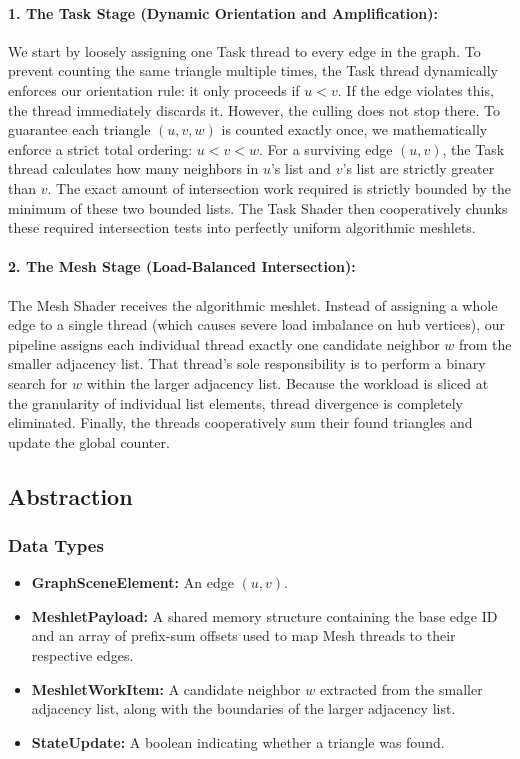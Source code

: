 \documentclass[11pt, a4paper]{article}
\begin{document}
\paragraph{1. The Task Stage (Dynamic Orientation and Amplification):}
We start by loosely assigning one Task thread to every edge in the graph. To prevent counting the same triangle multiple times, the Task thread dynamically enforces our orientation rule: it only proceeds if $u < v$. If the edge violates this, the thread immediately discards it. However, the culling does not stop there. To guarantee each triangle $(u, v, w)$ is counted exactly once, we mathematically enforce a strict total ordering: $u < v < w$. For a surviving edge $(u, v)$, the Task thread calculates how many neighbors in $u$'s list and $v$'s list are strictly greater than $v$. The exact amount of intersection work required is strictly bounded by the minimum of these two bounded lists. The Task Shader then cooperatively chunks these required intersection tests into perfectly uniform algorithmic meshlets.

\paragraph{2. The Mesh Stage (Load-Balanced Intersection):}
The Mesh Shader receives the algorithmic meshlet. Instead of assigning a whole edge to a single thread (which causes severe load imbalance on hub vertices), our pipeline assigns each individual thread exactly one candidate neighbor $w$ from the smaller adjacency list. That thread's sole responsibility is to perform a binary search for $w$ within the larger adjacency list. Because the workload is sliced at the granularity of individual list elements, thread divergence is completely eliminated. Finally, the threads cooperatively sum their found triangles and update the global counter.

\subsection{Abstraction}
\subsubsection{Data Types}
\begin{itemize}
    \item \textbf{GraphSceneElement:} An edge $(u, v)$.
    \item \textbf{MeshletPayload:} A shared memory structure containing the base edge ID and an array of prefix-sum offsets used to map Mesh threads to their respective edges.
    \item \textbf{MeshletWorkItem:} A candidate neighbor $w$ extracted from the smaller adjacency list, along with the boundaries of the larger adjacency list.
    \item \textbf{StateUpdate:} A boolean indicating whether a triangle was found.
\end{itemize}
\end{document}

